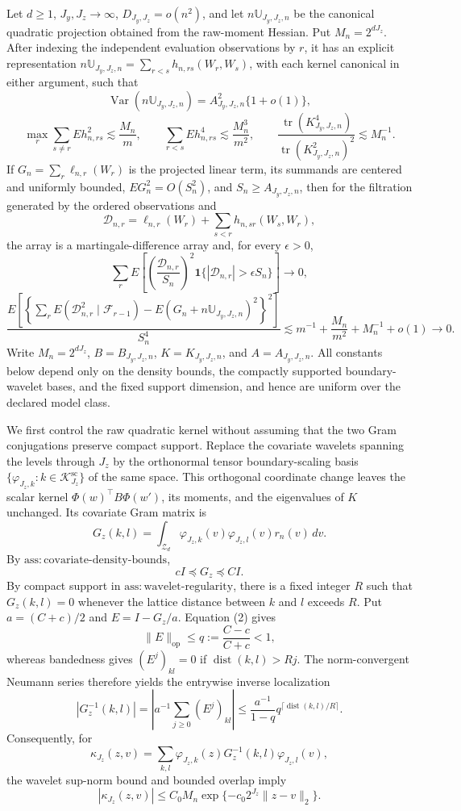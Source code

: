 Let \(d\ge1\), \(J_y,J_z\to\infty\), \(D_{J_y,J_z}=o(n^2)\), and let \(n\mathbb U_{J_y,J_z,n}\) be the canonical quadratic projection obtained from the raw-moment Hessian. Put \(M_n=2^{dJ_z}\). After indexing the independent evaluation observations by \(r\), it has an explicit representation \(n\mathbb U_{J_y,J_z,n}=\sum_{r<s}h_{n,rs}(W_r,W_s)\), with each kernel canonical in either argument, such that
\[
\operatorname{Var}(n\mathbb U_{J_y,J_z,n})=A_{J_y,J_z,n}^2\{1+o(1)\},
\]
\[
\max_r\sum_{s\ne r}E h_{n,rs}^2\lesssim \frac{M_n}{m},
\qquad
\sum_{r<s}E h_{n,rs}^4\lesssim\frac{M_n^3}{m^2},
\qquad
\frac{\operatorname{tr}(K_{J_y,J_z,n}^4)}{\operatorname{tr}(K_{J_y,J_z,n}^2)^2}\lesssim M_n^{-1}.
\]
If \(G_n=\sum_r\ell_{n,r}(W_r)\) is the projected linear term, its summands are centered and uniformly bounded, \(E G_n^2=O(S_n^2)\), and \(S_n\ge A_{J_y,J_z,n}\), then for the filtration generated by the ordered observations and
\[
\mathcal D_{n,r}=\ell_{n,r}(W_r)+\sum_{s<r}h_{n,sr}(W_s,W_r),
\]
the array is a martingale-difference array and, for every \(\epsilon>0\),
\[
\sum_rE\left[\left(\frac{\mathcal D_{n,r}}{S_n}\right)^2
\mathbf 1\{|\mathcal D_{n,r}|>\epsilon S_n\}\right]\to0,
\]
\[
\frac{E\left[\left\{\sum_rE(\mathcal D_{n,r}^2\mid\mathcal F_{r-1})-E(G_n+n\mathbb U_{J_y,J_z,n})^2\right\}^2\right]}{S_n^4}
\lesssim m^{-1}+\frac{M_n}{m^2}+M_n^{-1}+o(1)\to0.
\]
Write \(M_n=2^{dJ_z}\), \(B=B_{J_y,J_z,n}\), \(K=K_{J_y,J_z,n}\), and \(A=A_{J_y,J_z,n}\). All constants below depend only on the density bounds, the compactly supported boundary-wavelet bases, and the fixed support dimension, and hence are uniform over the declared model class.

We first control the raw quadratic kernel without assuming that the two Gram conjugations preserve compact support. Replace the covariate wavelets spanning the levels through \(J_z\) by the orthonormal tensor boundary-scaling basis \(\{\varphi_{J_z,k}:k\in\mathcal K_{J_z}^{\mathrm{sc}}\}\) of the same space. This orthogonal coordinate change leaves the scalar kernel \(\Phi(w)^{\top}B\Phi(w')\), its moments, and the eigenvalues of \(K\) unchanged. Its covariate Gram matrix is
\[
G_z(k,l)=\int_{\mathcal Z_d}\varphi_{J_z,k}(v)\varphi_{J_z,l}(v)r_n(v)\,dv. \tag{1}
\]
By \(\mathrm{ass{:}covariate\text{-}density\text{-}bounds}\),
\[
cI\preceq G_z\preceq CI. \tag{2}
\]
By compact support in \(\mathrm{ass{:}wavelet\text{-}regularity}\), there is a fixed integer \(R\) such that \(G_z(k,l)=0\) whenever the lattice distance between \(k\) and \(l\) exceeds \(R\). Put \(a=(C+c)/2\) and \(E=I-G_z/a\). Equation (2) gives
\[
\|E\|_{\mathrm{op}}\le q:=\frac{C-c}{C+c}<1,
\]
whereas bandedness gives \((E^j)_{kl}=0\) if \(\operatorname{dist}(k,l)>Rj\). The norm-convergent Neumann series therefore yields the entrywise inverse localization
\[
|G_z^{-1}(k,l)|
=\left|a^{-1}\sum_{j\ge0}(E^j)_{kl}\right|
\le \frac{a^{-1}}{1-q}q^{\lceil\operatorname{dist}(k,l)/R\rceil}. \tag{3}
\]
Consequently, for
\[
\kappa_{J_z}(z,v)=\sum_{k,l}\varphi_{J_z,k}(z)G_z^{-1}(k,l)\varphi_{J_z,l}(v),
\]
the wavelet sup-norm bound and bounded overlap imply
\[
|\kappa_{J_z}(z,v)|
\le C_0M_n\exp\{-c_0 2^{J_z}\|z-v\|_2\}. \tag{4}
\]

